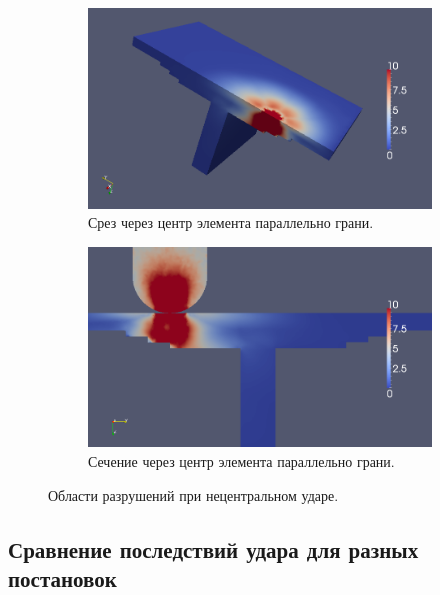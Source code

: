 \begin{figure}[h]
\begin{subfigure}[b]{\textwidth}
\center
\includegraphics[width=\textwidth]{png/pkm-experiment/wing-stringer-non-center/sum-3d.png}
\caption{Срез через центр элемента параллельно грани.}
\end{subfigure}
\begin{subfigure}[b]{\textwidth}
\center
\includegraphics[width=\textwidth]{png/pkm-experiment/wing-stringer-non-center/sum.png}
\caption{Сечение через центр элемента параллельно грани.}
\end{subfigure}
\caption{Области разрушений при нецентральном ударе.}
\label{pic:pkm_experiment_wing_stringer_non_center_result}
\end{figure}


\clearpage
\newpage

\subsection{Сравнение последствий удара для разных постановок}

